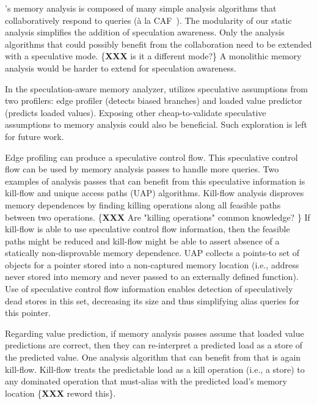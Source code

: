 \name's memory analysis is composed of many simple analysis algorithms
that collaboratively respond to queries (\`{a} la
CAF~\cite{johnson:cgo:17}).
%
The modularity of our static analysis simplifies the addition of
speculation awareness. Only the analysis algorithms that could
possibly benefit from the collaboration need to be extended with a
speculative mode. \{\textbf{XXX} is it a different mode?\}
%
A monolithic memory analysis would be harder to extend for
speculation awareness.

In the speculation-aware memory analyzer, \name utilizes speculative
assumptions from two profilers: edge profiler (detects biased
branches) and loaded value predictor (predicts loaded values).
%
Exposing other cheap-to-validate speculative assumptions to memory
analysis could also be beneficial.  Such exploration is left for
future work.

Edge profiling can produce a speculative control flow. This
speculative control flow can be used by memory analysis passes to
handle more queries.
%
Two examples of analysis passes that can benefit from this speculative
information is kill-flow and unique access paths (UAP) algorithms.
%
Kill-flow analysis disproves memory dependences by finding killing
operations along all feasible paths between two operations.
\{\textbf{XXX} Are "killing operations" common knowledge? \}
If kill-flow is able to use speculative control flow information, then
the feasible paths might be reduced and kill-flow might be able to
assert absence of a statically non-disprovable memory dependence.
%
UAP collects a points-to set of objects for a pointer stored into a
non-captured memory location (i.e., address never stored into memory
and never passed to an externally defined function).
Use of speculative control flow information enables detection of
speculatively dead stores in this set, decreasing its size and thus
simplifying alias queries for this pointer.


Regarding value prediction, if memory analysis passes assume that
loaded value predictions are correct, then they can re-interpret a
predicted load as a store of the predicted value. One analysis
algorithm that can benefit from that is again kill-flow. Kill-flow
treats the predictable load as a kill operation (i.e., a store) to any
dominated operation that must-alias with the predicted load's memory
location \{\textbf{XXX} reword this\}.

